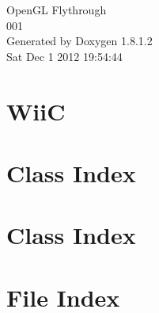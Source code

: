 \documentclass{book}
\begin{document}
\hypersetup{pageanchor=false,citecolor=blue}
\begin{titlepage}
\vspace*{7cm}
\begin{center}
{\Large Open\-G\-L Flythrough \\[1ex]\large 001 }\\
\vspace*{1cm}
{\large Generated by Doxygen 1.8.1.2}\\
\vspace*{0.5cm}
{\small Sat Dec 1 2012 19:54:44}\\
\end{center}
\end{titlepage}
\clearemptydoublepage
{}
\tableofcontents
\clearemptydoublepage
{}
\hypersetup{pageanchor=true,citecolor=blue}
\chapter{Wii\-C}
\label{index}\hypertarget{index}{}
\chapter{Class Index}

\chapter{Class Index}

\chapter{File Index}

\end{document}
